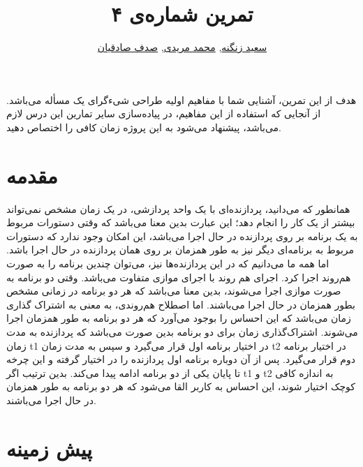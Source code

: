 \documentclass{utap}
\title{تمرین شماره‌ی ۴}
\author{ \href{mailto:zangenehsaeed412@gmail.com?subject=[AP\%20S98 A4]\%20}{سعید زنگنه},
\href{mailto:m.moridi.2009@gmail.com?subject=[AP\%20S98 A4]\%20}{محمد مریدی},
\href{mailto:sadeghian.sadaf22@gmail.com?subject=[AP\%20S98 A4]\%20}{صدف صادقیان}}
\begin{document}
	\maketitle
	
	هدف از این تمرین، آشنایی شما با مفاهیم اولیه طراحی شی‌ءگرای یک مسأله می‌باشد. از آنجایی که استفاده از این مفاهیم، در پیاده‌سازی سایر تمارین این درس لازم می‌باشد، پیشنهاد می‌شود به این پروژه زمان کافی را اختصاص دهید.
	\section{مقدمه}
	
	\hspace{5mm}
همانطور که می‌دانید، پردازنده‌ای با یک واحد پردازشی، در یک زمان مشخص نمی‌تواند بیشتر از یک کار را انجام دهد؛ این عبارت بدین معنا می‌باشد که وقتی دستورات مربوط به یک برنامه بر روی پردازنده در حال اجرا می‌باشد، این امکان وجود ندارد که دستورات مربوط به برنامه‌ای دیگر نیز به طور همزمان بر روی همان پردازنده در حال اجرا باشد. اما همه ما می‌دانیم که در این پردازنده‌ها نیز، می‌توان چندین برنامه را به صورت هم‌روند اجرا کرد. اجرای هم روند با اجرای موازی  متفاوت می‌باشد. وقتی دو برنامه به صورت موازی اجرا می‌شوند، بدین معنا می‌باشد که هر دو برنامه در زمانی مشخص بطور همزمان در حال اجرا می‌باشند. اما اصطلاح هم‌روندی، به معنی به اشتراک گذاری زمان  می‌باشد که این احساس را بوجود می‌آورد که هر دو برنامه به طور همزمان اجرا می‌شوند. اشتراک‌گذاری زمان برای دو برنامه بدین صورت می‌باشد که پردازنده به مدت زمان t1 در اختیار برنامه اول قرار می‌گیرد و سپس به مدت زمان t2 در اختیار برنامه دوم قرار می‌گیرد. پس از آن دوباره برنامه اول پردازنده را در اختیار گرفته و این چرخه تا پایان یکی از دو برنامه ادامه پیدا می‌کند. بدین ترتیب اگر t1 و t2 به اندازه کافی کوچک اختیار شوند، این احساس به کاربر القا می‌شود که هر دو برنامه به طور همزمان در حال اجرا می‌باشند.
	
	\section{پیش زمینه}
\end{document}
